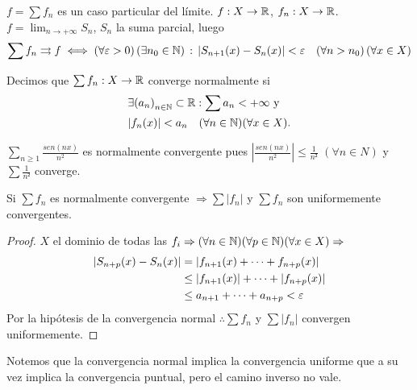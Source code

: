 \(f = \sum f_n\) es un caso particular del límite.
\(f : X \to \mathbb{R} \), \(f_n: X \to \mathbb{R} \).\(f = \lim_{n \to +\infty} S_n\), \(S_n\) la suma parcial, luego
\begin{align*}
  \sum f_n \rightrightarrows f \iff (\forall \varepsilon > 0) \, (\exists n_0 \in \mathbb{N}) \, : \, |S_{n+1}(x) - S_n(x)| < \varepsilon \quad (\forall n > n_0) \, (\forall x \in X)
\end{align*}

\begin{definition}
  Decimos que \(\sum f_n: X \to \mathbb{R} \) converge normalmente si
  \begin{align*}
     & \exists {(a_n)}_{n \in \mathbb{N}} \subset \mathbb{R} : \sum a_n < +\infty \text{ y } \\
     & |f_n(x)| < a_n \quad (\forall n \in \mathbb{N})(\forall x \in X).
  \end{align*}
\end{definition}

\begin{eg}
  \(\sum_{n \geq 1} \frac{sen(nx)}{n^2} \) es normalmente convergente pues \(|\frac{sen(nx)}{n^2}| \leq \frac{1}{n²} \) \((\forall n \in N)\) y \(\sum \frac{1}{n²} \) converge.
\end{eg}

\begin{theorem}
  Si \(\sum f_n\) es normalmente convergente \(\Rightarrow \sum |f_n|\) y \(\sum f_n\) son uniformemente convergentes.
  \begin{proof}
    \(X\) el dominio de todas las \(f_i \Rightarrow (\forall n \in \mathbb{N})(\forall p \in \mathbb{N})(\forall x \in X) \Rightarrow \) \begin{align*}
      |S_{n + p}(x) - S_n(x)| & = |f_{n+1}(x) + \cdots + f_{n + p}(x)| \\
      & \leq |f_{n+1}(x)| + \cdots + |f_{n+p}(x)| \\
      & \leq a_{n+1} + \cdots + a_{n+p} < \varepsilon
    \end{align*}
    Por la hipótesis de la convergencia normal \(\therefore \sum f_n\) y \(\sum |f_n|\) convergen uniformemente.
  \end{proof}
\end{theorem}

Notemos que la convergencia normal implica la convergencia uniforme que a su vez implica la convergencia puntual, pero el camino inverso no vale.

